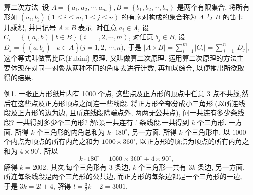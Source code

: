 
算二次方法.
设 $A=\left\{a_1, a_2, \cdots, a_m\right\}, B=\left\{b_1, b_2, \cdots, b_n\right\}$ 是两个有限集合, 将所有形如 $\left(a_i, b_j\right)(1 \leqslant i \leqslant m, 1 \leqslant j \leqslant n)$ 的有序对构成的集合称为 $A$ 与 $B$ 的笛卡儿乘积, 并用记号 $A \times B$ 表示.
对任意 $a_i \in A$, 设 $C_i=\left\{\left(a_i, b\right) \mid b \in B\right\}(i=1,2, \cdots, m)$, 对任意 $b_j \in B$, 设 $D_j=\left\{\left(a, b_j\right) \mid a \in A\right\}(j=1,2$, $\cdots, n)$, 于是 $|A \times B|=\sum_{i=1}^m\left|C_i\right|=\sum_{j=1}^n\left|D_j\right|$, 这个等式叫做富比尼(Fubini) 原理, 又叫做算二次原理.
运用算二次原理的方法主要体现在对同一对象从两种不同的角度去进行计数, 再加以综合, 以便推出所欲取得的结果.



例1. 一张正方形纸片内有 1000 个点, 这些点及正方形的顶点中任意 3 点不共线,然后在这些点及正方形顶点之间连一些线段, 将正方形全部分成小三角形 (以所连线段及正方形的边为边, 且所连线段除端点外, 两两无公共点), 问一共连有多少条线段? 一共得到多少个三角形?
解:设一共连有 $l$ 条线段,一共得到 $k$ 个三角形.
一方面, 所得 $k$ 个三角形的内角总和为 $k \cdot 180^{\circ}$, 另一方面, 所得 $k$ 个三角形中, 以 1000 个内点为顶点的所有内角之和为 $1000 \times 360^{\circ}$, 以正方形的顶点为顶点的所有内角之和为 $4 \times 90^{\circ}$, 所以
$$
k \cdot 180^{\circ}=1000 \times 360^{\circ}+4 \times 90^{\circ},
$$
解得 $k=2002$.
其次,每个三角形有 3 条边, $k$ 个三角形一共有 $3 k$ 条边, 另一方面,所连每条线段是两个三角形的公共边, 而正方形的每条边都是一个三角形的一边, 于是 $3 k=2 l+4$, 解得 $l=\frac{3}{2} k-2=3001$.



